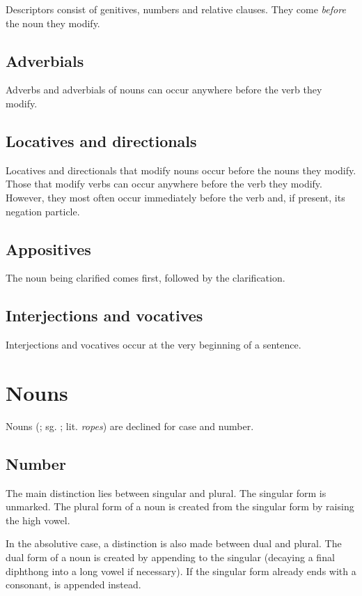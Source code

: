 \documentclass{book}
\begin{document}
Descriptors consist of genitives, numbers and relative clauses. They come \emph{before} the noun they modify.

\section{Adverbials}

Adverbs and adverbials of nouns can occur anywhere before the verb they modify.

\section{Locatives and directionals}

Locatives and directionals that modify nouns occur before the nouns they modify. Those that modify verbs can occur anywhere before the verb they modify. However, they most often occur immediately before the verb and, if present, its negation particle.

\section{Appositives}

The noun being clarified comes first, followed by the clarification.

\section{Interjections and vocatives}

Interjections and vocatives occur at the very beginning of a sentence.

\chapter{Nouns}

Nouns (; sg. ; lit. \emph{ropes}) are declined for case and number.

\section{Number}

The main distinction lies between singular and plural. The singular form is unmarked. The plural form of a noun is created from the singular form by raising the high vowel.

In the absolutive case, a distinction is also made between dual and plural. The dual form of a noun is created by appending  to the singular (decaying a final diphthong into a long vowel if necessary). If the singular form already ends with a consonant,  is appended instead.
\end{document}
